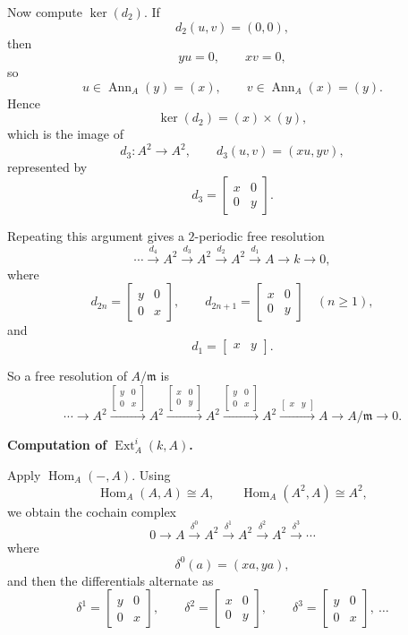 \documentclass[12pt,a4paper]{article}
\theoremstyle{notespace}
\begin{document}
Now compute \(\ker(d_2)\). If
\[
d_2(u,v)=(0,0),
\]
then
\[
yu=0,\qquad xv=0,
\]
so
\[
u\in \operatorname{Ann}_A(y)=(x),
\qquad
v\in \operatorname{Ann}_A(x)=(y).
\]
Hence
\[
\ker(d_2)=(x)\times (y),
\]
which is the image of
\[
d_3:A^2\to A^2,
\qquad
d_3(u,v)=(xu,yv),
\]
represented by
\[
d_3=
\begin{bmatrix}
	x&0\\
	0&y
\end{bmatrix}.
\]

Repeating this argument gives a \(2\)-periodic free resolution
\[
\cdots \xrightarrow{d_4} A^2 \xrightarrow{d_3} A^2 \xrightarrow{d_2} A^2 \xrightarrow{d_1} A \to k \to 0,
\]
where
\[
d_{2n}=
\begin{bmatrix}
	y&0\\
	0&x
\end{bmatrix},
\qquad
d_{2n+1}=
\begin{bmatrix}
	x&0\\
	0&y
\end{bmatrix}
\quad (n\ge 1),
\]
and
\[
d_1=\begin{bmatrix}x&y\end{bmatrix}.
\]

So a free resolution of \(A/\mathfrak m\) is
\[
\cdots \to A^2
\xrightarrow{\left[\begin{smallmatrix}y&0\\0&x\end{smallmatrix}\right]}
A^2
\xrightarrow{\left[\begin{smallmatrix}x&0\\0&y\end{smallmatrix}\right]}
A^2
\xrightarrow{\left[\begin{smallmatrix}y&0\\0&x\end{smallmatrix}\right]}
A^2
\xrightarrow{\left[\begin{smallmatrix}x&y\end{smallmatrix}\right]}
A
\to A/\mathfrak m \to 0.
\]

\medskip

\textbf{Computation of \(\operatorname{Ext}_A^i(k,A)\).}

Apply \(\operatorname{Hom}_A(-,A)\). Using
\[
\operatorname{Hom}_A(A,A)\cong A,\qquad \operatorname{Hom}_A(A^2,A)\cong A^2,
\]
we obtain the cochain complex
\[
0\to A \xrightarrow{\delta^0} A^2 \xrightarrow{\delta^1} A^2 \xrightarrow{\delta^2} A^2 \xrightarrow{\delta^3}\cdots
\]
where
\[
\delta^0(a)=(xa,ya),
\]
and then the differentials alternate as
\[
\delta^1=
\begin{bmatrix}
	y&0\\
	0&x
\end{bmatrix},
\qquad
\delta^2=
\begin{bmatrix}
	x&0\\
	0&y
\end{bmatrix},
\qquad
\delta^3=
\begin{bmatrix}
	y&0\\
	0&x
\end{bmatrix},
\ \dots
\]
\end{document}
